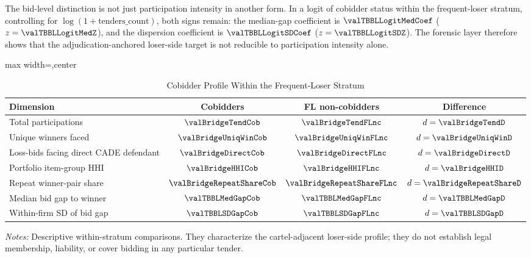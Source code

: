 The bid-level distinction is not just participation intensity in
another form. In a logit of cobidder status within the
frequent-loser stratum, controlling for
$\log(1+\text{tenders\_count})$, both signs remain: the
median-gap coefficient is $\valTBBLLogitMedCoef$
($z=\valTBBLLogitMedZ$), and the dispersion coefficient is
$\valTBBLLogitSDCoef$ ($z=\valTBBLLogitSDZ$). The forensic layer
therefore shows that the adjudication-anchored loser-side target
is not reducible to participation intensity alone.

\begin{table}[htbp]
\centering
\caption{Cobidder Profile Within the Frequent-Loser Stratum}
\label{tab:cobidder_signature_submission}
\footnotesize
\begin{adjustbox}{max width=\textwidth,center}
\begin{threeparttable}
\begin{tabular}{p{4.4cm}ccc}
\toprule
Dimension & Cobidders & FL non-cobidders & Difference \\
\midrule
Total participations & $\valBridgeTendCob$ & $\valBridgeTendFLnc$ & $d=\valBridgeTendD$ \\
Unique winners faced & $\valBridgeUniqWinCob$ & $\valBridgeUniqWinFLnc$ & $d=\valBridgeUniqWinD$ \\
Loss-bids facing direct CADE defendant & $\valBridgeDirectCob$ & $\valBridgeDirectFLnc$ & $d=\valBridgeDirectD$ \\
Portfolio item-group HHI & $\valBridgeHHICob$ & $\valBridgeHHIFLnc$ & $d=\valBridgeHHID$ \\
Repeat winner-pair share & $\valBridgeRepeatShareCob$ & $\valBridgeRepeatShareFLnc$ & $d=\valBridgeRepeatShareD$ \\
\midrule
Median bid gap to winner & $\valTBBLMedGapCob$ & $\valTBBLMedGapFLnc$ & $d=\valTBBLMedGapD$ \\
Within-firm SD of bid gap & $\valTBBLSDGapCob$ & $\valTBBLSDGapFLnc$ & $d=\valTBBLSDGapD$ \\
\bottomrule
\end{tabular}
\begin{tablenotes}
\footnotesize
\item \textit{Notes:} Descriptive within-stratum comparisons.
They characterize the cartel-adjacent loser-side profile; they
do not establish legal membership, liability, or cover bidding
in any particular tender.
\end{tablenotes}
\end{threeparttable}
\end{adjustbox}
\end{table}

